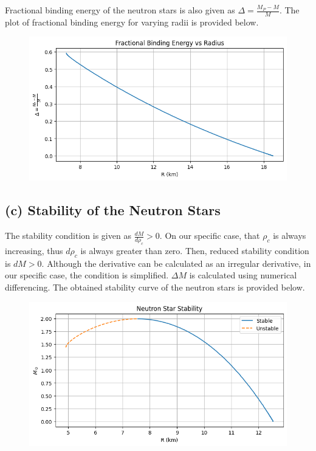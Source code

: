 \documentclass[aps,twocolumn,showpacs,preprintnumbers,nofootinbib,prl,superscriptaddress,groupedaddress]{revtex4-2}
\begin{document}
Fractional binding energy of the neutron stars is also given as $\Delta=\frac{M_P-M}{M}$. The plot of fractional binding energy for varying radii is provided below.

\begin{figure}[H]
	\centering
	\includegraphics[width=1\linewidth]{Plots/einstein-part-b}
	\label{fig:einstein-part-b}
\end{figure}
\FloatBarrier

\subsection{(c) Stability of the Neutron Stars}

The stability condition is given as $\frac{dM}{d\rho_c} > 0$. On our specific case, that $\rho_c$ is always increasing, thus $d\rho_c$ is always greater than zero. Then, reduced stability condition is $dM > 0$. Although the derivative can be calculated as an irregular derivative, in our specific case, the condition is simplified. $\Delta M$ is calculated using numerical differencing. The obtained stability curve of the neutron stars is provided below.

\begin{figure}[H]
	\centering
	\includegraphics[width=1\linewidth]{Plots/einstein-part-c}
	\label{fig:einstein-part-c}
\end{figure}
\FloatBarrier
\end{document}
